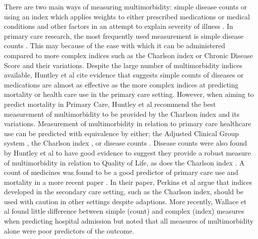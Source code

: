 \documentclass[12pt,]{report}
\begin{document}
There are two main ways of measuring multimorbidity: simple disease
counts or using an index which applies weights to either prescribed
medications or medical conditions and other factors in an attempt to
explain severity of illness \citep{RN16, RN34, RN29}. In primary care
research, the most frequently used measurement is simple disease counts
\citep{RN29}. This may because of the ease with which it can be
administered compared to more complex indices such as the Charlson index
\citep{RN339} or Chronic Disease Score \citep{RN340} and their
variations. Despite the large number of multimorbidity indices
available, Huntley et al \citeyearpar{RN29} cite evidence that suggests
simple counts of diseases or medications are almost as effective as the
more complex indices at predicting mortality or health care use in the
primary care setting. However, when aiming to predict mortality in
Primary Care, Huntley et al \citeyearpar{RN29} recommend the best
measurement of multimorbidity to be provided by the Charlson index
\citep{RN339} and its variations. Measurement of multimorbidity in
relation to primary care healthcare use can be predicted with
equivalence by either; the Adjusted Clinical Group system \citep{RN341},
the Charlson index \citep{RN339}, or disease counts \citep{RN29}.
Disease counts were also found by Huntley et al \citeyearpar{RN29} to
have good evidence to suggest they provide a robust measure of
multimorbidity in relation to Quality of Life, as does the Charlson
index \citep{RN339}. A count of medicines was found to be a good
predictor of primary care use and mortality in a more recent paper
\citep{RN247}. In their paper, Perkins et al \citeyearpar{RN78} argue
that indices developed in the secondary care setting, such as the
Charlson index, should be used with caution in other settings despite
adaptions. More recently, Wallace et al \citeyearpar{RN228} found little
difference between simple (count) and complex (index) measures when
predicting hospital admission but noted that all measures of
multimorbidity alone were poor predictors of the outcome.
\end{document}
